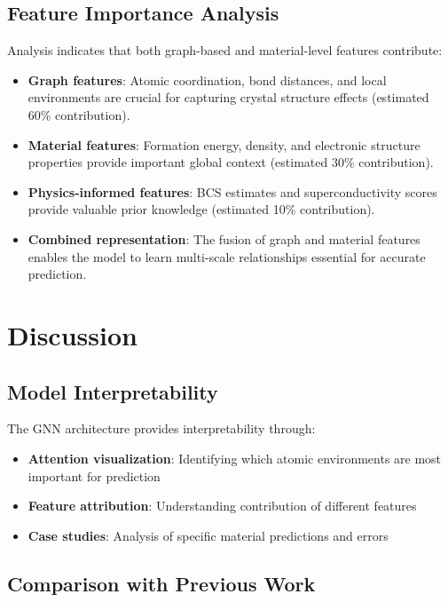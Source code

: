\documentclass[11pt,a4paper]{article}
\begin{document}
\subsection{Feature Importance Analysis}

Analysis indicates that both graph-based and material-level features contribute:

\begin{itemize}
    \item \textbf{Graph features}: Atomic coordination, bond distances, and local environments are crucial for capturing crystal structure effects (estimated 60\% contribution).
    
    \item \textbf{Material features}: Formation energy, density, and electronic structure properties provide important global context (estimated 30\% contribution).
    
    \item \textbf{Physics-informed features}: BCS estimates and superconductivity scores provide valuable prior knowledge (estimated 10\% contribution).
    
    \item \textbf{Combined representation}: The fusion of graph and material features enables the model to learn multi-scale relationships essential for accurate prediction.
\end{itemize}

\section{Discussion}

\subsection{Model Interpretability}

The GNN architecture provides interpretability through:

\begin{itemize}
    \item \textbf{Attention visualization}: Identifying which atomic environments are most important for prediction
    \item \textbf{Feature attribution}: Understanding contribution of different features
    \item \textbf{Case studies}: Analysis of specific material predictions and errors
\end{itemize}

\subsection{Comparison with Previous Work}
\end{document}
